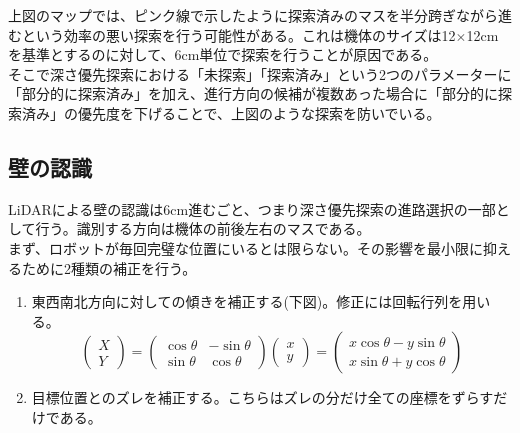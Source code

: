 \documentclass[dvipdfmx,a4paper]{jsarticle}
\begin{document}
  上図のマップでは、ピンク線で示したように探索済みのマスを半分跨ぎながら進むという効率の悪い探索を行う可能性がある。これは機体のサイズは12$\times$12cmを基準とするのに対して、6cm単位で探索を行うことが原因である。\\
  そこで深さ優先探索における「未探索」「探索済み」という2つのパラメーターに「部分的に探索済み」を加え、進行方向の候補が複数あった場合に「部分的に探索済み」の優先度を下げることで、上図のような探索を防いでいる。\\

    \subsection{壁の認識}
    \noindent
    LiDARによる壁の認識は6cm進むごと、つまり深さ優先探索の進路選択の一部として行う。識別する方向は機体の前後左右のマスである。\\
    \noindent
    まず、ロボットが毎回完璧な位置にいるとは限らない。その影響を最小限に抑えるために2種類の補正を行う。
    \begin{enumerate}
      \item 東西南北方向に対しての傾きを補正する(下図)。修正には回転行列を用いる。\\
      $$
      \begin{pmatrix}
      X\\
      Y
      \end{pmatrix}
      =
      \begin{pmatrix}
      \cos\theta & -\sin\theta \\
      \sin\theta & \cos\theta
      \end{pmatrix}
      \begin{pmatrix}
      x\\
      y
      \end{pmatrix}
      =
      \begin{pmatrix}
      x\cos\theta - y\sin\theta \\
      x\sin\theta + y\cos\theta
      \end{pmatrix}
      $$
      \item 目標位置とのズレを補正する。こちらはズレの分だけ全ての座標をずらすだけである。
    \end{enumerate}
\end{document}
